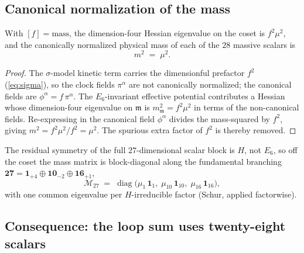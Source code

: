 \subsection{Canonical normalization of the mass}
\label{sec:masses:canonical}

\begin{theorem}\label{thm:masses:canonical}
With $[f]=\text{mass}$, the dimension-four Hessian eigenvalue on the coset is
$f^{2}\mu^{2}$, and the canonically normalized physical mass of each of the
$28$ massive scalars is
\begin{equation}\label{eq:masses:m2}
  m^{2} \;=\; \mu^{2}.
\end{equation}
\end{theorem}

\begin{proof}
The $\sigma$-model kinetic term carries the dimensionful prefactor $f^{2}$
(\autoref{eq:sigma}), so the clock fields $\pi^{\alpha}$ are not canonically
normalized; the canonical fields are $\phi^{\alpha}=f\,\pi^{\alpha}$. The
$E_{6}$-invariant effective potential contributes a Hessian whose dimension-four
eigenvalue on $\mathfrak m$ is $m_{\mathfrak m}^{2}=f^{2}\mu^{2}$ in terms of
the non-canonical fields. Re-expressing in the canonical field $\phi^{\alpha}$
divides the mass-squared by $f^{2}$, giving $m^{2}=f^{2}\mu^{2}/f^{2}=\mu^{2}$.
The spurious extra factor of $f^{2}$ is thereby removed.
\end{proof}

The residual symmetry of the full $27$-dimensional scalar block is $H$, not
$E_{6}$, so off the coset the mass matrix is block-diagonal along the
fundamental branching
$\mathbf{27}=\mathbf 1_{+4}\oplus\mathbf{10}_{-2}\oplus\mathbf{16}_{+1}$,
\begin{equation}\label{eq:masses:27block}
  \mathcal{M}_{27}
  \;=\;
  \operatorname{diag}\!\bigl(\mu_{1}\,\mathbf 1_{1},\;
  \mu_{10}\,\mathbf 1_{10},\;\mu_{16}\,\mathbf 1_{16}\bigr),
\end{equation}
with one common eigenvalue per $H$-irreducible factor (Schur, applied factorwise).

\subsection{Consequence: the loop sum uses twenty-eight scalars}
\label{sec:masses:loopsum}

